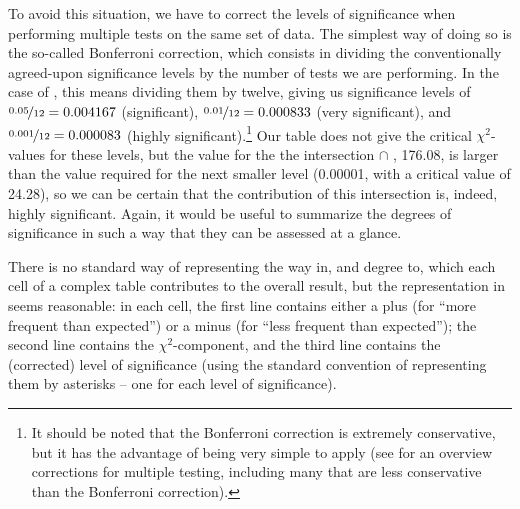 To avoid this situation, we have to correct the levels of significance when performing multiple tests on the same set of data. The simplest way of doing so is the so\hyp{}called Bonferroni  correction, which consists in dividing the conventionally agreed\hyp{}upon significance levels by the number of tests we are performing. In the case of , this means dividing them by twelve, giving us significance  levels of $\nicefrac{0.05}{12} = 0.004167$ (significant), $\nicefrac{0.01}{12} = 0.000833$ (very significant), and $\nicefrac{0.001}{12} = 0.000083$ (highly significant).\footnote{It should be noted that the Bonferroni  correction is extremely conservative, but it has the advantage of being very simple to apply (see \citealt{shaffer_multiple_1995} for an overview corrections for multiple testing, including many that are less conservative than the Bonferroni correction).} Our table does not give the critical $\chi^2$-values  for these levels, but the value for the the intersection   $\cap$ ,  176.08, is larger than the value required for the next smaller level (0.00001, with a critical value of 24.28), so we can be certain that the contribution of this intersection is, indeed, highly significant.  Again, it would be useful to summarize the degrees of significance in such a way that they can be assessed at a glance.

There is no standard way of representing the way in, and degree to, which each cell of a complex table contributes to the overall result, but the representation in  seems reasonable: in each cell, the first line contains either a plus (for ``more frequent than expected'')  or a minus (for ``less frequent than expected''); the second line contains the $\chi^2$-component,  and the third line contains the (corrected) level of significance  (using the standard convention of representing them by asterisks -- one for each level of significance).

